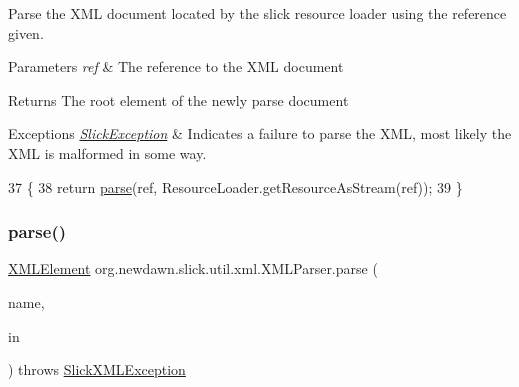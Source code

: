 Parse the X\+ML document located by the slick resource loader using the reference given.


\begin{DoxyParams}{Parameters}
{\em ref} & The reference to the X\+ML document \\
\hline
\end{DoxyParams}
\begin{DoxyReturn}{Returns}
The root element of the newly parse document 
\end{DoxyReturn}

\begin{DoxyExceptions}{Exceptions}
{\em \mbox{\hyperlink{classorg_1_1newdawn_1_1slick_1_1_slick_exception}{Slick\+Exception}}} & Indicates a failure to parse the X\+ML, most likely the X\+ML is malformed in some way. \\
\hline
\end{DoxyExceptions}

\begin{DoxyCode}
37                                                               \{
38         \textcolor{keywordflow}{return} \mbox{\hyperlink{classorg_1_1newdawn_1_1slick_1_1util_1_1xml_1_1_x_m_l_parser_a24c99740f08e3fe6d427aa9b478a01ba}{parse}}(ref, ResourceLoader.getResourceAsStream(ref));
39     \}
\end{DoxyCode}
\mbox{\label{classorg_1_1newdawn_1_1slick_1_1util_1_1xml_1_1_x_m_l_parser_ad6cf0561a3b5afa18f67a670d8f335ae}} 
\subsubsection{\texorpdfstring{parse()}{parse()}\hspace{0.1cm}{\footnotesize\ttfamily [2/2]}}
{\footnotesize\ttfamily \mbox{\hyperlink{classorg_1_1newdawn_1_1slick_1_1util_1_1xml_1_1_x_m_l_element}{X\+M\+L\+Element}} org.\+newdawn.\+slick.\+util.\+xml.\+X\+M\+L\+Parser.\+parse (\begin{DoxyParamCaption}\item[{String}]{name,  }\item[{Input\+Stream}]{in }\end{DoxyParamCaption}) throws \mbox{\hyperlink{classorg_1_1newdawn_1_1slick_1_1util_1_1xml_1_1_slick_x_m_l_exception}{Slick\+X\+M\+L\+Exception}}\hspace{0.3cm}{\ttfamily [inline]}}

